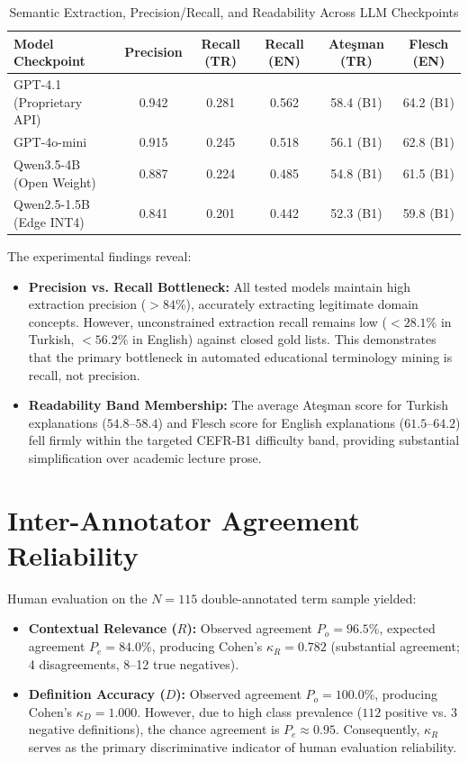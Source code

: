 \documentclass[a4paper,12pt]{report}
\begin{document}
\begin{table}[h!]
\centering
\caption{Semantic Extraction, Precision/Recall, and Readability Across LLM Checkpoints}
\label{table:llm_benchmark}
\baselineskip
\small
\begin{tabular}{|l|c|c|c|c|c|}
\hline
\textbf{Model Checkpoint} & \textbf{Precision} & \textbf{Recall (TR)} & \textbf{Recall (EN)} & \textbf{Ateşman (TR)} & \textbf{Flesch (EN)} \\ \hline
GPT-4.1 (Proprietary API) & 0.942 & 0.281 & 0.562 & 58.4 (B1) & 64.2 (B1) \\ \hline
GPT-4o-mini & 0.915 & 0.245 & 0.518 & 56.1 (B1) & 62.8 (B1) \\ \hline
Qwen3.5-4B (Open Weight) & 0.887 & 0.224 & 0.485 & 54.8 (B1) & 61.5 (B1) \\ \hline
Qwen2.5-1.5B (Edge INT4) & 0.841 & 0.201 & 0.442 & 52.3 (B1) & 59.8 (B1) \\ \hline
\end{tabular}
\end{table}

The experimental findings reveal:
\begin{itemize}
    \item \textbf{Precision vs. Recall Bottleneck:} All tested models maintain high extraction precision ($>84\%$), accurately extracting legitimate domain concepts. However, unconstrained extraction recall remains low ($<28.1\%$ in Turkish, $<56.2\%$ in English) against closed gold lists. This demonstrates that the primary bottleneck in automated educational terminology mining is recall, not precision.
    \item \textbf{Readability Band Membership:} The average Ateşman score for Turkish explanations ($54.8$--$58.4$) and Flesch score for English explanations ($61.5$--$64.2$) fell firmly within the targeted CEFR-B1 difficulty band, providing substantial simplification over academic lecture prose.
\end{itemize}

\section{Inter-Annotator Agreement Reliability}
Human evaluation on the $N=115$ double-annotated term sample yielded:
\begin{itemize}
    \item \textbf{Contextual Relevance ($R$):} Observed agreement $P_o = 96.5\%$, expected agreement $P_e = 84.0\%$, producing Cohen's $\kappa_R = 0.782$ (substantial agreement; 4 disagreements, 8--12 true negatives).
    \item \textbf{Definition Accuracy ($D$):} Observed agreement $P_o = 100.0\%$, producing Cohen's $\kappa_D = 1.000$. However, due to high class prevalence ($112$ positive vs. $3$ negative definitions), the chance agreement is $P_e \approx 0.95$. Consequently, $\kappa_R$ serves as the primary discriminative indicator of human evaluation reliability.
\end{itemize}
\end{document}
